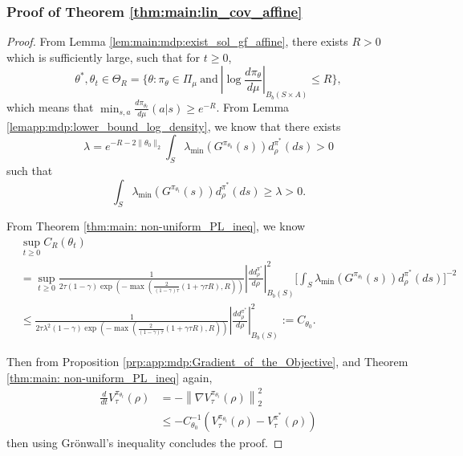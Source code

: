 \documentclass{amsart}
\theoremstyle{definition}
\begin{document}
\subsubsection{Proof of Theorem \ref{thm:main:lin_cov_affine}}
\label{sec:pf_lin_cov_affine}
\aspInitAffine* 
\LinCovAffine*  

\begin{proof}
From Lemma \ref{lem:main:mdp:exist_sol_gf_affine}, there exists $R >0$ which is sufficiently large, such that for $t \geq 0$, 
\[
\theta^*, \theta_t \in \Theta_{R} = \{\theta: \pi_\theta \in \Pi_\mu \ \text{and}\  |\log \frac{d \pi_\theta}{d\mu}|_{B_b(S\times A)} \leq R \},
\] 
which means that $\min_{s,a}\frac{d \pi_{\theta_t}}{d \mu}(a|s) \geq e^{-R}$.
From Lemma \ref{lemapp:mdp:lower_bound_log_density}, we know that there exists 
\[
\lambda = e^{-R-2\|\theta_0\|_2}\int_{S}   \lambda_{\min} \left(G^{\pi_{\theta_0}}(s)\right) d_\rho^{\pi^*}(ds) >0
\] 
such that 
\begin{equation}\label{eq:positive_lambda_affine}
\int_{S}\lambda_{\min} (G^{\pi_{\theta_t}}(s))d_\rho^{\pi^*}(ds) \geq \lambda >0.
\end{equation}

From Theorem \ref{thm:main: non-uniform_PL_ineq}, we know
\begin{align*}
& \sup_{t \geq 0} C_R(\theta_t) \nonumber\\
& = \sup_{t \geq 0} \frac{1}{2\tau(1-\gamma) \exp\left({-\max\left(\frac{2}{(1-\gamma)\tau} \left(1+\gamma\tau R\right), R\right)}\right)}\left|\frac{d d_\rho^{\pi^*}}{ d \rho}\right|^2_{B_b(S)} \bigg[\int_S \lambda_{\min}(G^{\pi_{\theta_t}}(s))d_\rho^{\pi^*}(ds)\bigg]^{-2}\\
& \leq \frac{1}{2\tau \lambda^2 (1-\gamma) \exp\left({-\max\left(\frac{2}{(1-\gamma)\tau} \left(1+\gamma\tau R\right), R\right)}\right)}\left|\frac{d d_\rho^{\pi^*}}{ d \rho}\right|^2_{B_b(S)} := C_{\theta_0}.
\end{align*}

Then from Proposition \ref{prp:app:mdp:Gradient_of_the_Objective}, and Theorem \ref{thm:main: non-uniform_PL_ineq} again,
\begin{align*}
\frac{d}{dt} V_\tau^{\pi_{\theta_t}}(\rho) &= - \left\|\nabla V_\tau^{\pi_{\theta_t}}(\rho)\right\|^2_2\\
& \leq -C_{\theta_0}^{-1} \left(V_\tau^{\pi_{\theta_t}}(\rho) - V_\tau^{\pi^*}  (\rho) \right)
\end{align*}
then using Grönwall's inequality concludes the proof.
\end{proof}
\end{document}
